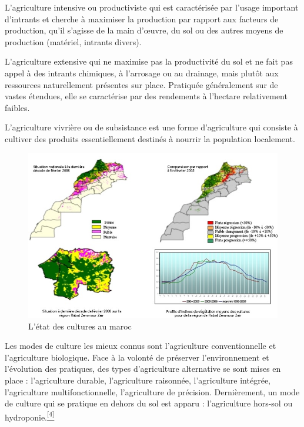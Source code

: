 \documentclass[12pt, openany]{report}
\begin{document}
\begin{mylist}
\item L’agriculture intensive ou productiviste qui est caractérisée par l’usage important d’intrants et cherche à maximiser la production par rapport aux facteurs de production, qu’il s’agisse de la main d’œuvre, du sol ou des autres moyens de production (matériel, intrants divers).
\item L’agriculture extensive qui ne maximise pas la productivité du sol et ne fait pas appel à des intrants chimiques, à l’arrosage ou au drainage, mais plutôt aux ressources naturellement présentes sur place. Pratiquée généralement sur de vastes étendues, elle se caractérise par des rendements à l’hectare relativement faibles.
\item L’agriculture vivrière ou de subsistance est une forme d’agriculture qui consiste à cultiver des produits essentiellement destinés à nourrir la population localement.
\end{mylist}

\begin{figure}[hp]
\centering
\includegraphics[scale=0.9]{etat.jpg}
\caption{L'état des cultures au maroc}
\end{figure}


Les modes de culture les mieux connus sont l’agriculture conventionnelle et l’agriculture biologique. Face à la volonté de préserver l’environnement et l’évolution des pratiques, des types d’agriculture alternative se sont mises en place : l’agriculture durable, l’agriculture raisonnée, l’agriculture intégrée, l’agriculture multifonctionnelle, l’agriculture de précision. Dernièrement, un mode de culture qui se pratique en dehors du sol est apparu : l’agriculture hors-sol ou hydroponie.\hyperref[sec:refs]{\textsuperscript{[4]}}
\end{document}
